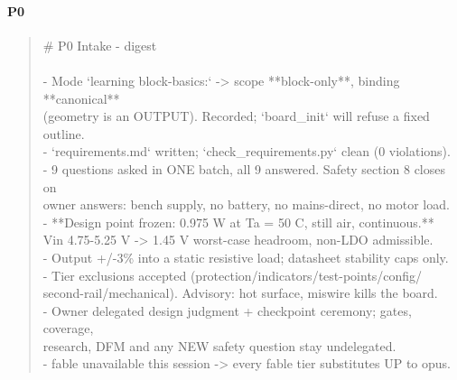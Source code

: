 \documentclass[11pt,a4paper]{article}
\begin{document}
\paragraph*{P0}
\begin{quote}\small\ttfamily\raggedright
\# P0 Intake - digest\\
~\\
- Mode `learning block-basics:` -\textgreater{} scope {*}{*}block-only{*}{*}, binding {*}{*}canonical{*}{*}\\
  (geometry is an OUTPUT). Recorded; `board\_init` will refuse a fixed outline.\\
- `requirements.md` written; `check\_requirements.py` clean (0 violations).\\
- 9 questions asked in ONE batch, all 9 answered. Safety section 8 closes on\\
  owner answers: bench supply, no battery, no mains-direct, no motor load.\\
- {*}{*}Design point frozen: 0.975 W at Ta = 50 C, still air, continuous.{*}{*}\\
  Vin 4.75-5.25 V -\textgreater{} 1.45 V worst-case headroom, non-LDO admissible.\\
- Output +/-3\% into a static resistive load; datasheet stability caps only.\\
- Tier exclusions accepted (protection/indicators/test-points/config/\\
  second-rail/mechanical). Advisory: hot surface, miswire kills the board.\\
- Owner delegated design judgment + checkpoint ceremony; gates, coverage,\\
  research, DFM and any NEW safety question stay undelegated.\\
- fable unavailable this session -\textgreater{} every fable tier substitutes UP to opus.
\end{quote}
\end{document}
